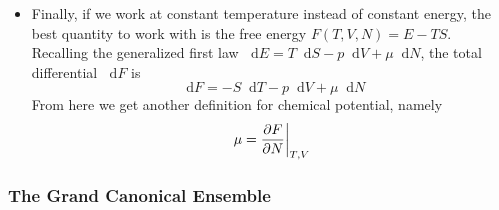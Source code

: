 \documentclass[11pt, a4paper]{article}
\newcommand{\diff}{\mathop{}\!\mathrm{d}} %
\begin{document}
\begin{itemize}
	\item Finally, if we work at constant temperature instead of constant energy, the best quantity to work with is the free energy $ F(T, V, N) = E - TS $. Recalling the generalized first law $ \diff E = T \diff S - p\diff V + \mu \diff N $, the total differential $ \diff F $ is
	\begin{equation*}
		\diff F = - S \diff T - p\diff V + \mu \diff N
	\end{equation*}
	From here we get another definition for chemical potential, namely
	\begin{equation*}
		\mu = \pdv{F}{N}\bigg|_{T, V}
	\end{equation*}
	
\end{itemize}

\subsubsection{The Grand Canonical Ensemble}
\end{document}
